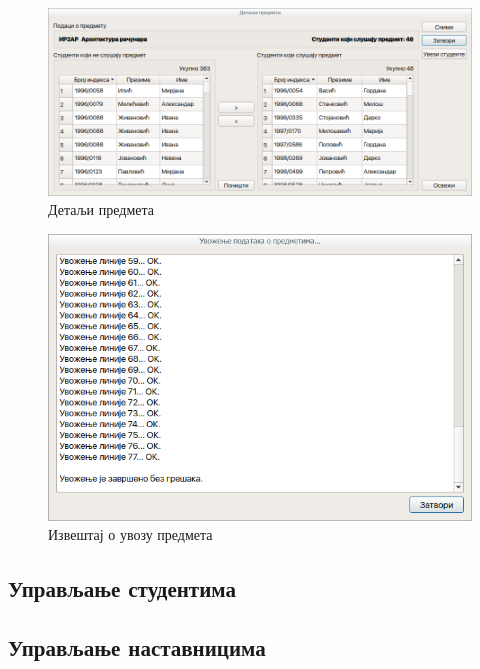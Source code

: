 \documentclass[a4paper, 12pt, diplomski]{etfcyr}
\begin{document}
\begin{justify}
					\begin{figure}[H]
						\begin{center}
							\includegraphics[width=1.0\textwidth]{manual/courses_details_dialog.png}
						\end{center}
						\caption{Детаљи предмета}
						\label{figure:courses_details_dialog}
					\end{figure}
					\begin{figure}[H]
						\begin{center}
							\includegraphics[width=1.0\textwidth]{manual/courses_import_dialog.png}
						\end{center}
						\caption{Извештај о увозу предмета}
						\label{figure:courses_import_dialog}
					\end{figure}
				\end{justify}

			\subsection{Управљање студентима}

			\subsection{Управљање наставницима}
\end{document}

